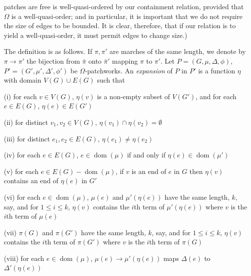 \noindent patches are free is well-quasi-ordered by our containment relation, provided that $\Omega$ is a well-quasi-order; and in particular, it is important that we do not require the size of edges to be bounded. It is clear, therefore, that if our relation is to yield a well-quasi-order, it must permit edges to change size.)

The definition is as follows. If $\pi, \pi'$ are marches of the same length, we denote by $\pi \to \pi'$ the bijection from $\bar{\pi}$ onto $\bar{\pi}'$ mapping $\pi$ to $\pi'$. Let $P = (G, \mu, \Delta, \phi)$, $P' = (G', \mu', \Delta', \phi')$ be $\Omega$-patchworks. An \textit{expansion} of $P$ in $P'$ is a function $\eta$ with domain $V(G) \cup E(G)$ such that

\hspace*{12pt}(i) for each $v \in V(G)$, $\eta(v)$ is a non-empty subset of $V(G')$, and for each $e \in E(G)$, $\eta(e) \in E(G')$

\hspace*{12pt}(ii) for distinct $v_1, v_2 \in V(G)$, $\eta(v_1) \cap \eta(v_2) = \emptyset$

\hspace*{12pt}(iii) for distinct $e_1, e_2 \in E(G)$, $\eta(e_1) \neq \eta(e_2)$

\hspace*{12pt}(iv) for each $e \in E(G)$, $e \in \operatorname{dom}(\mu)$ if and only if $\eta(e) \in \operatorname{dom}(\mu')$

\hspace*{12pt}(v) for each $e \in E(G) - \operatorname{dom}(\mu)$, if $v$ is an end of $e$ in $G$ then $\eta(v)$ contains an end of $\eta(e)$ in $G'$

\hspace*{12pt}(vi) for each $e \in \operatorname{dom}(\mu)$, $\mu(e)$ and $\mu'(\eta(e))$ have the same length, $k$, say, and for $1 \le i \le k$, $\eta(v)$ contains the $i$th term of $\mu'(\eta(e))$ where $v$ is the $i$th term of $\mu(e)$

\hspace*{12pt}(vii) $\pi(G)$ and $\pi(G')$ have the same length, $k$, say, and for $1 \le i \le k$, $\eta(v)$ contains the $i$th term of $\pi(G')$ where $v$ is the $i$th term of $\pi(G)$

\hspace*{12pt}(viii) for each $e \in \operatorname{dom}(\mu)$, $\mu(e) \to \mu'(\eta(e))$ maps $\Delta(e)$ to $\Delta'(\eta(e))$

